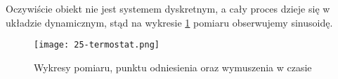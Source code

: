 Oczywiście obiekt nie jest systemem dyskretnym, a cały proces dzieje się w układzie dynamicznym, stąd na wykresie \ref{fig:25-termostat} pomiaru obserwujemy sinusoidę. 

\begin{figure}[!h]
    \centering \texttt{[image: 25-termostat.png]}
    \caption{Wykresy pomiaru, punktu odniesienia oraz wymuszenia w czasie}\label{fig:25-termostat}
\end{figure}

